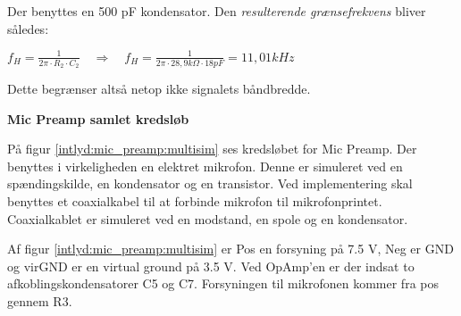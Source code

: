 Der benyttes en 500 pF kondensator. Den \textit{resulterende grænsefrekvens} bliver således:
\begin{center}
${ f }_{ H }=\frac { 1 }{ 2\pi \cdot { R }_{ 2 }\cdot { C }_{ 2 } } \quad \Longrightarrow \quad { f }_{ H }=\frac { 1 }{ 2\pi \cdot 28,9k\Omega \cdot 18pF } =11,01kHz$
\end{center}

Dette begrænser altså netop ikke signalets båndbredde.

\textbf{Mic Preamp samlet kredsløb}

På figur \ref{intlyd:mic_preamp:multisim} ses kredsløbet for Mic Preamp. Der benyttes i virkeligheden en elektret mikrofon. Denne er simuleret ved en spændingskilde, en kondensator og en transistor. Ved implementering skal benyttes et coaxialkabel til at forbinde mikrofon til mikrofonprintet. Coaxialkablet er simuleret ved en modstand, en spole og en kondensator. 


Af figur \ref{intlyd:mic_preamp:multisim} er Pos en forsyning på 7.5 V, Neg er GND og virGND er en virtual ground på 3.5 V. Ved OpAmp'en er der indsat to afkoblingskondensatorer C5 og C7. 
Forsyningen til mikrofonen kommer fra pos gennem R3. 


